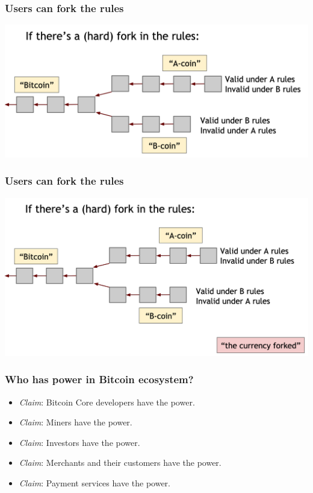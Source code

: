 \documentclass{beamer}
\begin{document}
\begin{frame}
  \frametitle{Users can fork the rules}
 	\centering
	\includegraphics[scale=0.3]{fork2}
\end{frame}
\begin{frame}
  \frametitle{Users can fork the rules}
 	\centering
	\includegraphics[scale=0.3]{fork3}
\end{frame}
\begin{frame}
  \frametitle{Who has power in Bitcoin ecosystem?}
  
	\begin{itemize}
		\item \emph{Claim}: Bitcoin Core developers have the power. \pause
		\item \emph{Claim}: Miners have the power. \pause
		\item \emph{Claim}: Investors have the power. \pause
		\item \emph{Claim}: Merchants and their customers have the power. \pause
		\item \emph{Claim}: Payment services have the power.
	\end{itemize}
\end{frame}
\end{document}
